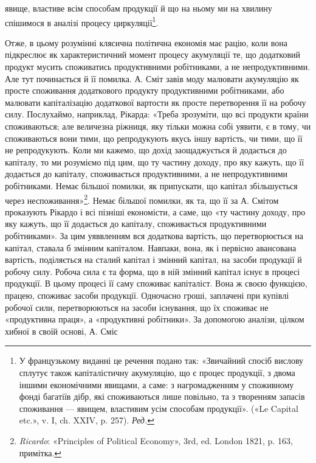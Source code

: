 \parcont{}  %
явище, властиве всім способам продукції й що на ньому ми на
хвилину спішимося в аналізі процесу циркуляції\footnote*{
У французькому виданні це речення подано так: «Звичайний спосіб
вислову сплутує також капіталістичну акумуляцію, що є процес
продукції, з двома іншими економічними явищами, а саме: з нагромадженням
у споживному фонді багатіїв дібр, які споживаються лише
повільно, та з творенням запасів споживання — явищем, властивим усім
способам продукції». («Le Capital etc.», v. I, ch. XXIV, p. 257). \emph{Ред.}
}.

Отже, в цьому розумінні клясична політична економія має
рацію, коли вона підкреслює як характеристичний момент процесу
акумуляції те, що додатковий продукт мусить споживатись
продуктивними робітниками, а не непродуктивними. Але тут починається
й її помилка. А. Сміт завів моду малювати акумуляцію як
просте споживання додаткового продукту продуктивними робітниками,
або малювати капіталізацію додаткової вартости як просте
перетворення її на робочу силу. Послухаймо, наприклад, Рікарда:
«Треба зрозуміти, що всі продукти країни споживаються; але величезна
ріжниця, яку тільки можна собі уявити, є в тому, чи споживаються
вони тими, що репродукують якусь іншу вартість, чи тими,
що її не репродукують. Коли ми кажемо, що дохід заощаджується
й додається до капіталу, то ми розуміємо під цим, що ту частину
доходу, про яку кажуть, що її додається до капіталу, споживається
продуктивними, а не непродуктивними робітниками. Немає
більшої помилки, як припускати, що капітал збільшується через
неспоживання»\footnote{
\emph{Ricardo}: «Principles of Political Economy», 3rd, ed. London
1821, p. 163, примітка.
}. Немає більшої помилки, як та, що її за
А. Смітом проказують Рікардо і всі пізніші економісти, а саме,
що «ту частину доходу, про яку кажуть, що її додається до капіталу,
споживається продуктивними робітниками». За цим уяввленням
вся додаткова вартість, що перетворюється на капітал,
ставала б змінним капіталом. Навпаки, вона, як і первісно авансована
вартість, поділяється на сталий капітал і змінний капітал,
на засоби продукції й робочу силу. Робоча сила є та форма, що
в ній змінний капітал існує в процесі продукції. В цьому процесі
її саму споживає капіталіст. Вона ж своєю функцією, працею,
споживає засоби продукції. Одночасно гроші, заплачені при
купівлі робочої сили, перетворюються на засоби існування, що
їх споживає не «продуктивна праця», а «продуктивні робітники».
За допомогою аналізи, цілком хибної в своїй основі, А. Сміс
